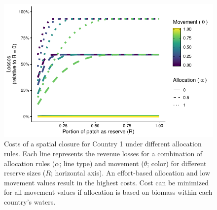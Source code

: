 \documentclass[12pt]{article}
\begin{document}
\begin{figure}[htbp]
\centering
\includegraphics{img/allocation_cost_plot.pdf}
\caption{\label{fig:allocation_cost_plot}Costs of a spatial closure for Country 1 under different allocation rules. Each line represents the revenue losses for a combination of allocation rules ($\alpha$; line type) and movement ($\theta$; color) for different reserve sizes ($R$; horizontal axis). An effort-based allocation and low movement values result in the highest costs. Cost can be minimized for all movement values if allocation is based on biomass within each country’s waters.}
\end{figure}
\end{document}
